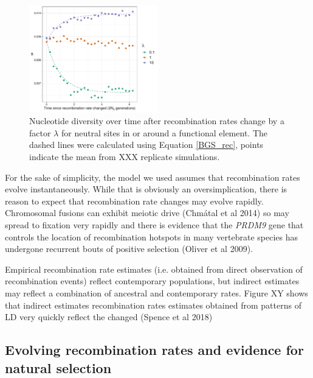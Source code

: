 \documentclass[10pt,twoside, twocolumn]{GSA_format}
\begin{document}
\vspace{5px}


\begin{figure}[H]
\includegraphics[width=0.5\textwidth]{../TheoreticalExpectation/B_over_time_fixed_s_plot_singlePanel}
\caption{Nucleotide diversity over time after recombination rates change by a factor $\lambda$ for neutral sites in or around a functional element. The dashed lines were calculated using Equation \ref{BGS_rec}, points indicate the mean from XXX replicate simulations.}
\label{fig:BGS_over_time_fixed_s}
\end{figure}

For the sake of simplicity, the model we used assumes that recombination rates evolve instantaneously. While that is obviously an oversimplication, there is reason to expect that recombination rate changes may evolve rapidly. Chromosomal fusions can exhibit meiotic drive (Chmátal et al 2014) so may spread to fixation very rapidly and there is evidence that the \textit{PRDM9} gene that controls the location of recombination hotspots in many vertebrate species has undergone recurrent bouts of positive selection (Oliver et al 2009). 

\vspace{5px}

Empirical recombination rate estimates (i.e. obtained from direct observation of recombination events) reflect contemporary populations, but indirect estimates may reflect a combination of ancestral and contemporary rates. Figure XY shows that indirect estimates recombination rates estimates obtained from patterns of LD very quickly reflect the changed (Spence et al 2018) 



\subsection{Evolving recombination rates and evidence for natural selection}
\end{document}
